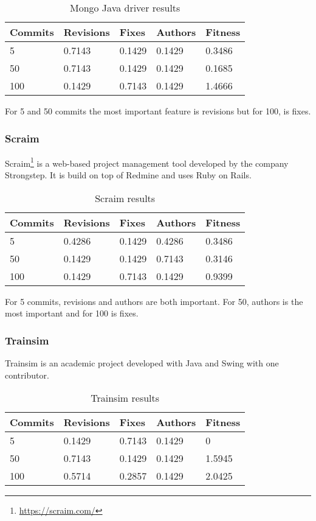 \begin{table}[H]
    \centering
    \caption{Mongo Java driver results}
    \label{table:learning_mongojavadriver}
    \begin{tabular}{|l|l|l|l|l|}
        \hline
        Commits & Revisions & Fixes & Authors & Fitness \\ \hline
        5 & 0.7143 & 0.1429 & 0.1429 & 0.3486 \\ \hline  
        50 & 0.7143 & 0.1429 & 0.1429 & 0.1685 \\ \hline
        100 & 0.1429 & 0.7143  & 0.1429 & 1.4666 \\ \hline
    \end{tabular}
\end{table}

For 5 and 50 commits the most important feature is revisions but for 100, is fixes.

\subsubsection{Scraim}
Scraim\footnote{\url{https://scraim.com/}} is a web-based project management tool developed by the company Strongstep. It is build on top of Redmine and uses Ruby on Rails.

\begin{table}[H]
    \centering
    \caption{Scraim results}
    \label{table:learning_scraim}
    \begin{tabular}{|l|l|l|l|l|}
        \hline
        Commits & Revisions & Fixes & Authors & Fitness \\ \hline
        5         & 0.4286     & 0.1429 & 0.4286   & 0.3486 \\ \hline
        50        & 0.1429 & 0.1429 & 0.7143   & 0.3146 \\ \hline
        100       & 0.1429     & 0.7143  & 0.1429    & 0.9399 \\ \hline
    \end{tabular}
\end{table}
For 5 commits, revisions and authors are both important. For 50, authors is the most important and for 100 is fixes.

\subsubsection{Trainsim}
Trainsim is an academic project developed with Java and Swing with one contributor.

\begin{table}[H]
    \centering
    \caption{Trainsim results}
    \label{table:learning_trainsim}
    \begin{tabular}{|l|l|l|l|l|}
        \hline
        Commits & Revisions & Fixes & Authors & Fitness \\ \hline
        5         & 0.1429     & 0.7143 & 0.1429   & 0 \\ \hline
        50        & 0.7143 & 0.1429 & 0.1429   & 1.5945 \\ \hline
        100       & 0.5714     & 0.2857  & 0.1429    & 2.0425 \\ \hline
    \end{tabular}
\end{table}

